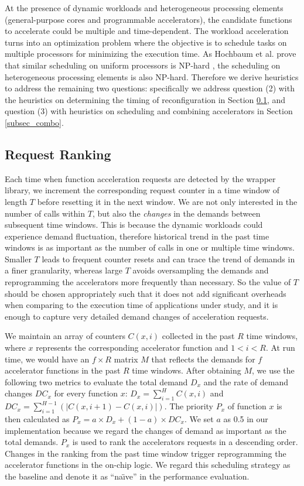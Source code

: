 At the presence of dynamic workloads and heterogeneous processing
elements (general-purpose cores and programmable accelerators), the
candidate functions to accelerate could be multiple and
time-dependent. The workload acceleration turns into an optimization
problem where the objective is to schedule tasks on multiple
processors for minimizing the execution time. As Hochbaum et
al. prove that similar scheduling on uniform processors is NP-hard
\cite{hochbaum88}, the scheduling on heterogeneous processing 
elements is also NP-hard. Therefore we derive heuristics to address
the remaining two questions: specifically we address question (2) with
the heuristics on determining the timing of reconfiguration in
Section \ref{subsec_ranking}, and question (3) with heuristics on
scheduling and combining accelerators in Section \ref{subsec_combo}.

\subsection{Request Ranking}
\label{subsec_ranking}

Each time when function acceleration requests are detected by the
wrapper library, we increment the corresponding request counter in a
time window of length $T$ before resetting it in the next window. 
We are not only interested in the number of calls within $T$, but also the {\em changes} in the demands
between subsequent time windows. This is because the dynamic workloads
could experience demand fluctuation, therefore historical trend in the
past time windows is as important as the number of calls in one or
multiple time windows.
Smaller $T$ leads to frequent counter resets and can trace the trend
of demands in a finer granularity, whereas large $T$ avoids
oversampling the demands and reprogramming the accelerators more
frequently than necessary. So the value of $T$ should be chosen
appropriately such that it does not add significant overheads when
comparing to the execution time of applications under study, and it is
enough to capture very detailed demand changes of acceleration
requests. 

We maintain an array of counters $C(x, i)$ collected in the past $R$
time windows, where $x$ represents the corresponding accelerator
function and $1<i<R$. At run time, we would have an $f \times R$
matrix $M$ that reflects the demands for $f$ accelerator functions in
the past $R$ time windows.  After obtaining $M$, we use the following
two metrics to evaluate the total demand $D_x$ and the rate of demand
changes $DC_x$ for every function $x$: $D_{x} = \sum_{i=1}^{H}C(x,i)$
and $DC_{x} = \sum_{i=1}^{H-1}(|C(x, i+1)-C(x, i)|)$.  The priority
$P_x$ of function $x$ is then calculated as $P_x = a \times D_x +
(1-a) \times DC_x$. We set $a$ as 0.5 in our implementation because we
regard the changes of demand as important as the total demands. $P_x$
is used to rank the accelerators requests in a descending
order. Changes in the ranking from the past time window trigger
reprogramming the accelerator functions in the on-chip logic. We regard this scheduling strategy as the baseline and denote it as ``na\"{\i}ve'' in the performance evaluation.




